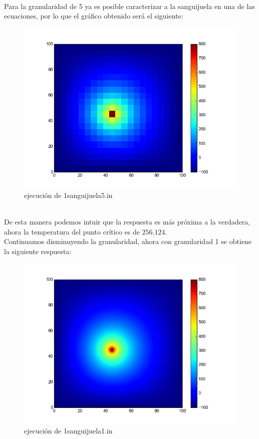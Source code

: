 \\
Para la granularidad de 5 ya es posible caracterizar a la sanguijuela en una de las ecuaciones, por lo que el gráfico obtenido será el siguiente:
\begin{figure}[H]
\centering

\includegraphics[width=400pt]{otrostests/12.png}
\caption{ejecución de 1sanguijuela5.in}

\end{figure}
\\
De esta manera podemos intuir que la respuesta es más próxima a la verdadera, ahora la temperatura del punto crítico es de $256.124$.
\\
Continuamos disminuyendo la granularidad, ahora con granularidad 1 se obtiene la siguiente respuesta:
\begin{figure}[H]
\centering

\includegraphics[width=400pt]{otrostests/13.png}
\caption{ejecución de 1sanguijuela1.in}

\end{figure}

